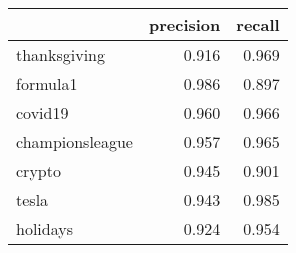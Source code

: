 \begin{tabular}{lrr}
\toprule
{} &  precision &  recall \\
\midrule
thanksgiving    &      0.916 &   0.969 \\
formula1        &      0.986 &   0.897 \\
covid19         &      0.960 &   0.966 \\
championsleague &      0.957 &   0.965 \\
crypto          &      0.945 &   0.901 \\
tesla           &      0.943 &   0.985 \\
holidays        &      0.924 &   0.954 \\
\bottomrule
\end{tabular}
